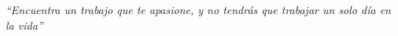 \bigskip
{\itshape\noindent ``Encuentra un trabajo que te apasione, y no tendrás que trabajar un solo día en la vida''}
\bigskip
